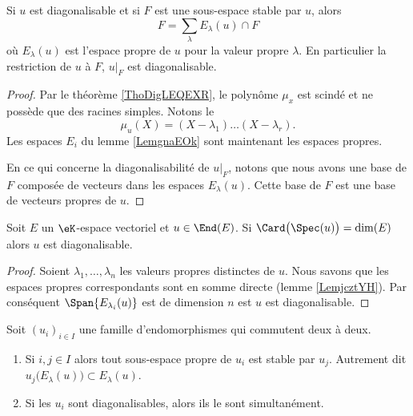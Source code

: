 \begin{corollary}       \label{CorQeVqsS}
    Si \( u\) est diagonalisable et si \( F\) est une sous-espace stable par \( u\), alors
    \begin{equation}
        F=\sum_{\lambda}E_{\lambda}(u)\cap F
    \end{equation}
    où \( E_{\lambda}(u)\) est l'espace propre de \( u\) pour la valeur propre \( \lambda\). En particulier la restriction de \( u\) à \( F\), \( u|_F\) est diagonalisable.
\end{corollary}

\begin{proof}
    Par le théorème \ref{ThoDigLEQEXR}, le polynôme \( \mu_x\) est scindé et ne possède que des racines simples. Notons le
    \begin{equation}
        \mu_u(X)=(X-\lambda_1)\ldots (X-\lambda_r).
    \end{equation}
    Les espaces \( E_i\) du lemme \ref{LemgnaEOk} sont maintenant les espaces propres.

    En ce qui concerne la diagonalisabilité de \( u|_F\), notons que nous avons une base de \( F\) composée de vecteurs dans les espaces \( E_{\lambda}(u)\). Cette base de \( F\) est une base de vecteurs propres de \( u\).
\end{proof}

\begin{lemma}
    Soit \( E\) un \( \eK\)-espace vectoriel et \( u\in\End(E)\). Si \( \Card\big( \Spec(u) \big)=\dim(E)\) alors \( u\) est diagonalisable.
\end{lemma}

\begin{proof}
    Soient \( \lambda_1,\ldots, \lambda_n\) les valeurs propres distinctes de \( u\). Nous savons que les espaces propres correspondants sont en somme directe (lemme \ref{LemjcztYH}). Par conséquent \( \Span\{ E_{\lambda_i}(u) \}\) est de dimension \( n\) est \( u\) est diagonalisable.
\end{proof}

\begin{proposition}     \label{PropGqhAMei}
    Soit \( (u_i)_{i\in I}\) une famille d'endomorphismes qui commutent deux à deux.
    \begin{enumerate}
        \item       \label{ItemGqhAMei}
            Si \( i,j\in I\) alors tout sous-espace propre de \( u_i\) est stable par \( u_j\). Autrement dit \( u_j\big(E_{\lambda}(u)\big)\subset E_{\lambda}(u)\).
        \item
            Si les \( u_i\) sont diagonalisables, alors ils le sont simultanément.
    \end{enumerate}
\end{proposition}

